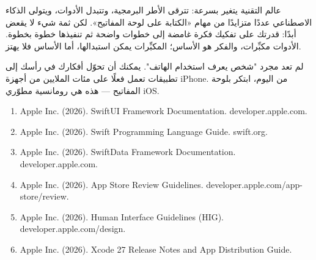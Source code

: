 عالم التقنية يتغير بسرعة: تترقى الأطر البرمجية، وتتبدل الأدوات، ويتولى الذكاء الاصطناعي عددًا متزايدًا من مهام «الكتابة على لوحة المفاتيح». لكن ثمة شيء لا يقعض أبدًا: قدرتك على تفكيك فكرة غامضة إلى خطوات واضحة ثم تنفيذها خطوة بخطوة. الأدوات مكبِّرات، والفكر هو الأساس؛ المكبِّرات يمكن استبدالها، أما الأساس فلا يهتز.

لم تعد مجرد "شخص يعرف استخدام الهاتف". يمكنك أن تحوّل أفكارك في رأسك إلى تطبيقات تعمل فعلًا على مئات الملايين من أجهزة iPhone. من اليوم، ابتكر بلوحة المفاتيح — هذه هي رومانسية مطوّري iOS.


\begin{enumerate}
  \item Apple Inc. (2026). SwiftUI Framework Documentation. developer.apple.com.
  \item Apple Inc. (2026). Swift Programming Language Guide. swift.org.
  \item Apple Inc. (2026). SwiftData Framework Documentation. developer.apple.com.
  \item Apple Inc. (2026). App Store Review Guidelines. developer.apple.com/app-store/review.
  \item Apple Inc. (2026). Human Interface Guidelines (HIG). developer.apple.com/design.
  \item Apple Inc. (2026). Xcode 27 Release Notes and App Distribution Guide.
\end{enumerate}
